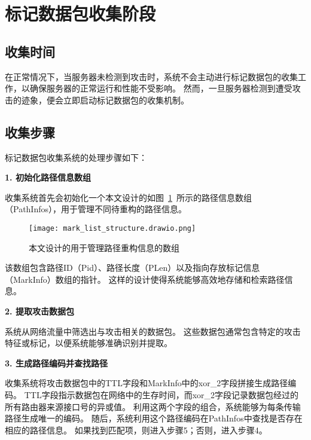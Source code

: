 \section{标记数据包收集阶段}
\subsection{收集时间}
在正常情况下，当服务器未检测到攻击时，系统不会主动进行标记数据包的收集工作，以确保服务器的正常运行和性能不受影响。
然而，一旦服务器检测到遭受攻击的迹象，便会立即启动标记数据包的收集机制。

\subsection{收集步骤}
标记数据包收集系统的处理步骤如下：

\textbf{1. 初始化路径信息数组}\par
收集系统首先会初始化一个本文设计的如图~\ref{fig:markinfo_list}~所示的路径信息数组（PathInfos），用于管理不同待重构的路径信息。
\begin{figure}[h]
  \centering
  \texttt{[image: mark\_list\_structure.drawio.png]}
  \caption{本文设计的用于管理路径重构信息的数组}
  \label{fig:markinfo_list}
\end{figure} 
该数组包含路径ID（Pid）、路径长度（PLen）以及指向存放标记信息（MarkInfo）数组的指针。
这样的设计使得系统能够高效地存储和检索路径信息。\par

\textbf{2. 提取攻击数据包}\par
系统从网络流量中筛选出与攻击相关的数据包。
这些数据包通常包含特定的攻击特征或标记，以便系统能够准确识别并提取。\par

\textbf{3. 生成路径编码并查找路径}\par
收集系统将攻击数据包中的TTL字段和MarkInfo中的xor\_2字段拼接生成路径编码。
TTL字段指示数据包在网络中的生存时间，而xor\_2字段记录数据包经过的所有路由器来源接口号的异或值。
利用这两个字段的组合，系统能够为每条传输路径生成唯一的编码。
随后，系统利用这个路径编码在PathInfos中查找是否存在相应的路径信息。
如果找到匹配项，则进入步骤5；否则，进入步骤4。\par

